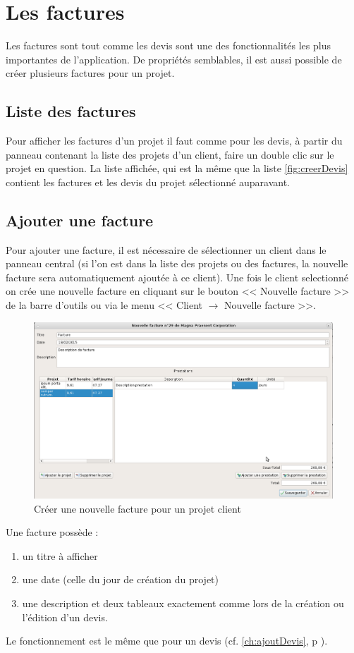 \chapter{Les factures}
Les factures sont tout comme les devis sont une des fonctionnalités les plus importantes de l'application. De propriétés semblables, il est aussi possible de créer plusieurs factures pour un projet.
\section{Liste des factures}
Pour afficher les factures d'un projet il faut comme pour les devis, à partir du panneau contenant la liste des projets d'un client, faire un double clic sur le projet en question. La liste affichée, qui est la même que la liste \ref{fig:creerDevis} contient les factures et les devis du projet sélectionné auparavant.

\section{Ajouter une facture}
Pour ajouter une facture, il est nécessaire de sélectionner un client dans le panneau central (si l'on est dans la liste des projets ou des factures, la nouvelle facture sera automatiquement ajoutée à ce client). Une fois le client selectionné on crée une nouvelle facture en cliquant sur le bouton << Nouvelle facture >> de la barre d'outils ou via le menu << Client $\rightarrow$ Nouvelle facture >>. 
\begin{figure}[H]
	\centering
	\includegraphics[width=17cm]{screens/creerFacture.png}
	\caption{Créer une nouvelle facture pour un projet client}
	\label{fig:creerFacture}
\end{figure}
Une facture possède :
\begin{enumerate}
	\item un titre à afficher
	\item une date (celle du jour de création du projet)
	\item une description et deux tableaux exactement comme lors de la création ou l'édition d'un devis.
\end{enumerate}	
 Le fonctionnement est le même que pour un devis (cf. \ref*{ch:ajoutDevis}, p \pageref{ch:Prestations}).

